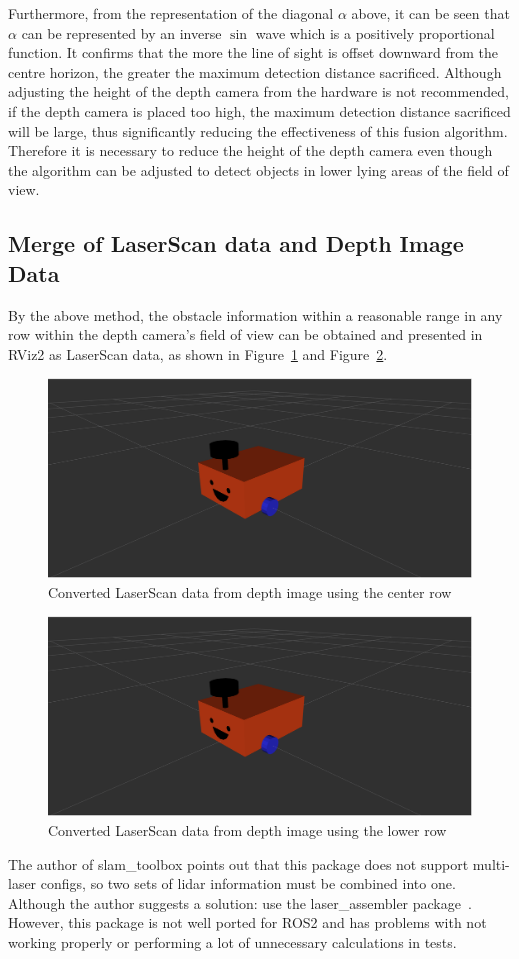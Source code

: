 Furthermore, from the representation of the diagonal $\alpha$ above, 
it can be seen that $\alpha$ can be represented by an inverse $\sin$ wave which is a positively proportional function. 
It confirms that the more the line of sight is offset downward from the centre horizon, 
the greater the maximum detection distance sacrificed. 
Although adjusting the height of the depth camera from the hardware is not recommended, 
if the depth camera is placed too high, the maximum detection distance sacrificed will be large, 
thus significantly reducing the effectiveness of this fusion algorithm. 
Therefore it is necessary to reduce the height of the depth camera even though the algorithm can be adjusted to detect objects in lower lying areas of the field of view.

\subsection{Merge of LaserScan data and Depth Image Data}
By the above method, the obstacle information 
within a reasonable range in any row within the depth camera's field of view can be obtained and presented
in RViz2 as LaserScan data, as shown in Figure~\ref{fig:centre_row} and Figure~\ref{fig:lower_row}.
\begin{figure}[H]
    \centering
    \includegraphics[width=0.8\linewidth]{figs/robot.png}
    \caption{Converted LaserScan data from depth image using the center row}
    \label{fig:centre_row}
\end{figure}
\begin{figure}[H]
    \centering
    \includegraphics[width=0.8\linewidth]{figs/robot.png}
    \caption{Converted LaserScan data from depth image using the lower row}
    \label{fig:lower_row}
\end{figure}
The author of slam\_toolbox points out that this package does not support multi-laser configs, 
so two sets of lidar information must be combined into one. 
Although the author suggests a solution: use the laser\_assembler package~\cite{github}.
However, this package is not well ported for ROS2
and has problems with not working properly or performing a lot of unnecessary calculations in tests. 

